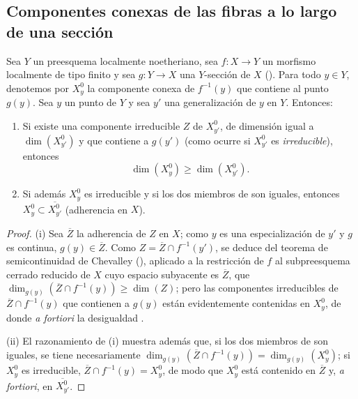 \subsection{Componentes conexas de las fibras a lo largo de una sección}
\label{subsection:IV.15.6}

\begin{proposition}[15.6.1]
\label{IV.15.6.1}
Sea $Y$ un preesquema localmente noetheriano, sea $f:X\to Y$ un morfismo localmente de tipo finito y sea $g:Y\to X$ una $Y$-sección de $X$ \textup{()}.
Para todo $y\in Y$, denotemos por $X_y^0$ la componente conexa de $f^{-1}(y)$ que contiene al punto $g(y)$.
Sea $y$ un punto de $Y$ y sea $y'$ una generalización de $y$ en $Y$.
Entonces:
\begin{enumerate}[label=(\roman*)]
  \item Si existe una componente irreducible $Z$ de $X_{y'}^0$, de dimensión igual a $\dim(X_{y'}^0)$ y que contiene a $g(y')$ \textup{(como ocurre si $X_{y'}^0$ es \emph{irreducible})}, entonces
\begin{equation}
\tag{15.6.1.1}
\label{IV.15.6.1.1-fr}
  \dim(X_y^0)\geqslant\dim(X_{y'}^0).
\end{equation}
  \item Si además $X_y^0$ es irreducible y si los dos miembros de  son iguales, entonces $X_y^0\subset\overline{X_{y'}^0}$ (adherencia en $X$).
\end{enumerate}
\end{proposition}

\begin{proof}
(i)
Sea $\overline Z$ la adherencia de $Z$ en $X$; como $y$ es una especialización de $y'$ y $g$ es continua, $g(y)\in\overline Z$.
Como $Z=\overline Z\cap f^{-1}(y')$, se deduce del teorema de semicontinuidad de Chevalley (), aplicado a la restricción de $f$ al subpreesquema cerrado reducido de $X$ cuyo espacio subyacente es $\overline Z$, que $\dim_{g(y)}(\overline Z\cap f^{-1}(y))\geqslant\dim(Z)$; pero las componentes irreducibles de $\overline Z\cap f^{-1}(y)$ que contienen a $g(y)$ están evidentemente contenidas en $X_y^0$, de donde \emph{a fortiori} la desigualdad .

(ii)
El razonamiento de (i) muestra además que, si los dos miembros de  son iguales, se tiene necesariamente $\dim_{g(y)}(\overline Z\cap f^{-1}(y))=\dim_{g(y)}(X_y^0)$; si $X_y^0$ es irreducible, $\overline Z\cap f^{-1}(y)=X_y^0$, de modo que $X_y^0$ está contenido en $\overline Z$ y, \emph{a fortiori}, en $\overline{X_{y'}^0}$.
\end{proof}

